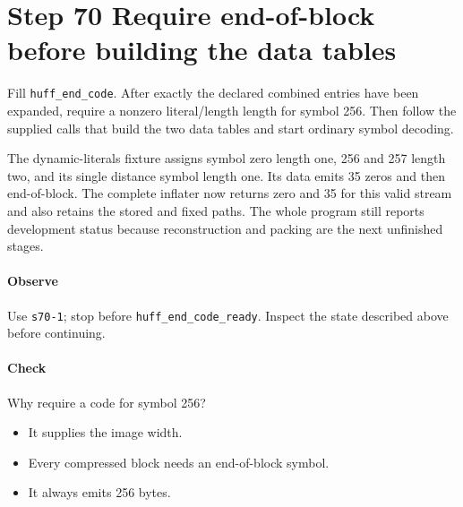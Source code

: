 \section{Step 70 Require end-of-block before building the data tables}\label{png-huff-s70}
Fill \texttt{huff\_end\_code}. After exactly the declared combined entries have been expanded, require a nonzero literal/length length for symbol 256. Then follow the supplied calls that build the two data tables and start ordinary symbol decoding.

The dynamic-literals fixture assigns symbol zero length one, 256 and 257 length two, and its single distance symbol length one. Its data emits 35 zeros and then end-of-block. The complete inflater now returns zero and 35 for this valid stream and also retains the stored and fixed paths. The whole program still reports development status because reconstruction and packing are the next unfinished stages.

\paragraph{Observe} Use \texttt{s70-1}; stop before \texttt{huff\_end\_code\_ready}. Inspect the state described above before continuing.

\paragraph{Check} Why require a code for symbol 256?
\begin{itemize}
  \item[A.] It supplies the image width.
  \item[B.] Every compressed block needs an end-of-block symbol.
  \item[C.] It always emits 256 bytes.
\end{itemize}
